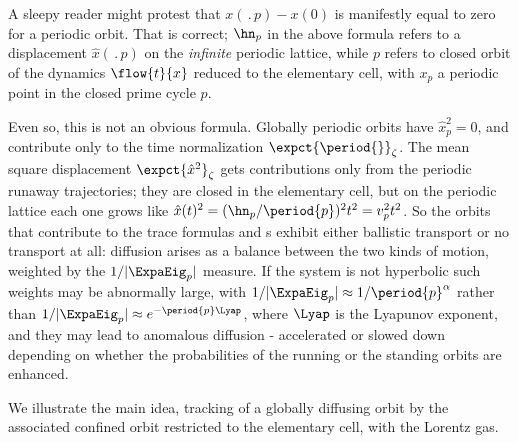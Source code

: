 A sleepy reader might protest that $x(\period{p})-x(0)$ is manifestly
equal to zero for a periodic orbit. That is correct; $\hn_p$ in the
above formula refers to a displacement $\hat{x}(\period{p})$ on the
{\em infinite} periodic lattice, while $p$ refers to closed orbit of
the dynamics $\flow{t}{x}$ reduced to the elementary cell, with $x_p$
a periodic point in the closed prime cycle $p$.

Even so, this is not an obvious formula. Globally periodic orbits have
$\hat{x}_p^2 =0$, and contribute only to the time normalization
$\expct{\period{}}_\zeta$. The mean square displacement
$\expct{\hat{x}^2}_\zeta$ gets contributions only from the periodic
runaway trajectories; they are closed in the elementary cell, but on
the periodic lattice each one grows like $\hat{x}(t)^2 =
(\hn_{p}/\period{p})^2 t^2 = v^2_p t^2$.  So the orbits that
contribute to the trace formulas and \Fd s exhibit either ballistic
transport or no transport at all: diffusion arises as a balance
between the two kinds of motion, weighted by the $1/|\ExpaEig_p|$
measure. If the system is not hyperbolic such weights may be
abnormally large, with $1/|\ExpaEig_p| \approx 1/\period{p}^\alpha$
rather than $1/|\ExpaEig_p| \approx e^{-\period{p}\Lyap}$, where
$\Lyap$ is the Lyapunov exponent, and they may lead to anomalous
diffusion - accelerated or slowed down depending on whether the
probabilities of the running or the standing orbits are enhanced.

We illustrate the main idea, tracking of a globally diffusing
orbit by the associated confined orbit restricted to the
elementary cell, with the Lorentz gas.


